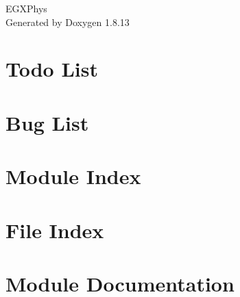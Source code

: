 \documentclass[twoside]{book}
\newcommand{\+}{\discretionary{\mbox{\scriptsize$\hookleftarrow$}}{}{}}
\newcommand{\clearemptydoublepage}{%
  \newpage{\pagestyle{empty}\cleardoublepage}%
}
\begin{document}
\hypersetup{pageanchor=false,
             bookmarksnumbered=true,
             pdfencoding=unicode
            }
\begin{titlepage}
\vspace*{7cm}
\begin{center}%
{\Large E\+G\+X\+Phys }\\
\vspace*{1cm}
{\large Generated by Doxygen 1.8.13}\\
\end{center}
\end{titlepage}
\clearemptydoublepage
{}
\tableofcontents
\clearemptydoublepage
{}
\hypersetup{pageanchor=true}

\chapter{Todo List}
\label{todo}

\chapter{Bug List}
\label{bug}

\chapter{Module Index}

\chapter{File Index}

\chapter{Module Documentation}













\end{document}
